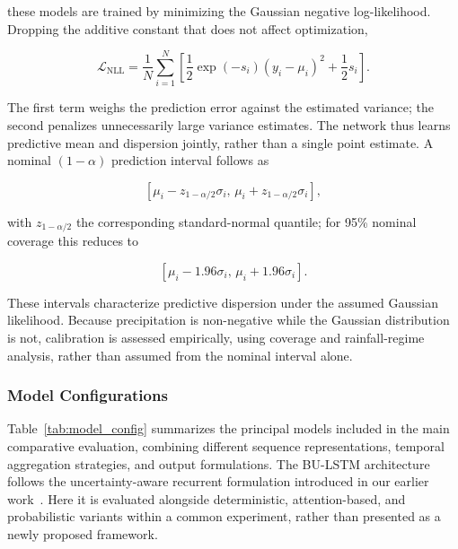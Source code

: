 \documentclass[referee,pdflatex,sn-basic]{sn-jnl}%
\theoremstyle{thmstyleone}%
\theoremstyle{thmstyletwo}%
\theoremstyle{thmstylethree}%
\begin{document}
these models are trained by minimizing the Gaussian negative log-likelihood. Dropping the additive constant that does not affect optimization,

\begin{equation}
\mathcal{L}_{\mathrm{NLL}} = \frac{1}{N} \sum_{i=1}^{N} \left[\frac{1}{2}\exp(-s_i)\left(y_i-\mu_i\right)^2 + \frac{1}{2}s_i\right].
\label{eq:nll_loss}
\end{equation}

The first term weighs the prediction error against the estimated variance; the second penalizes unnecessarily large variance estimates. The network thus learns predictive mean and dispersion jointly, rather than a single point estimate. A nominal $(1-\alpha)$ prediction interval follows as

\begin{equation}
\left[\mu_i-z_{1-\alpha/2}\sigma_i,\, \mu_i+z_{1-\alpha/2}\sigma_i\right],
\label{eq:prediction_interval}
\end{equation}

with $z_{1-\alpha/2}$ the corresponding standard-normal quantile; for 95\% nominal coverage this reduces to

\begin{equation}
\left[\mu_i-1.96\sigma_i,\, \mu_i+1.96\sigma_i\right].
\label{eq:prediction_interval_95}
\end{equation}

These intervals characterize predictive dispersion under the assumed Gaussian likelihood. Because precipitation is non-negative while the Gaussian distribution is not, calibration is assessed empirically, using coverage and rainfall-regime analysis, rather than assumed from the nominal interval alone.


\subsubsection{Model Configurations}
\label{sec:model_configurations}

Table~\ref{tab:model_config} summarizes the principal models included in the main comparative evaluation, combining different sequence representations, temporal aggregation strategies, and output formulations. The BU-LSTM architecture follows the uncertainty-aware recurrent formulation introduced in our earlier work~\citep{10906190}. Here it is evaluated alongside deterministic, attention-based, and probabilistic variants within a common experiment, rather than presented as a newly proposed framework.
\end{document}
